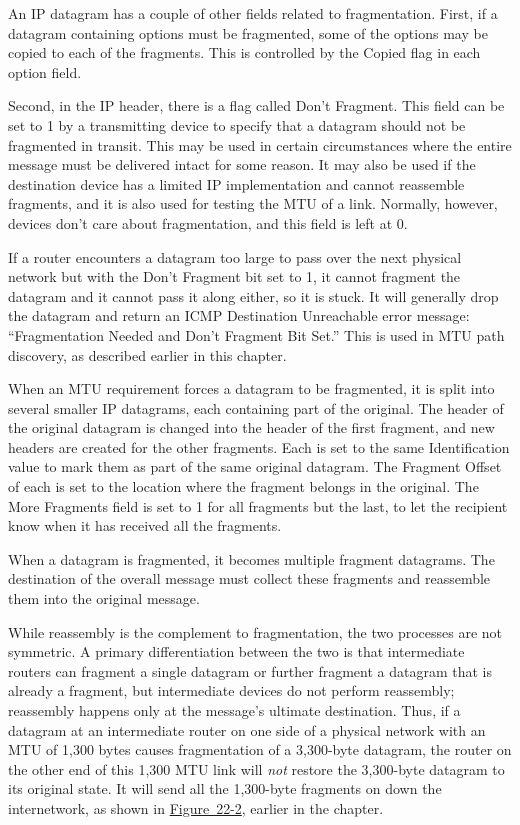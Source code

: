 An IP datagram has a couple of other fields related to fragmentation.
First, if a datagram containing options must be fragmented, some of the
options may be copied to each of the fragments. This is controlled by
the \protect\hypertarget{ch22s02.htmlux5cux23idx-CHP-22-0812}{}{}Copied
flag in each option field.

Second, in the IP header, there is a flag called
\protect\hypertarget{ch22s02.htmlux5cux23idx-CHP-22-0813}{}{}Don't
Fragment. This field can be set to 1 by a transmitting device to specify
that a datagram should not be fragmented in transit. This may be used in
certain circumstances where the entire message must be delivered intact
for some reason. It may also be used if the destination device has a
limited IP implementation and cannot reassemble fragments, and it is
also used for testing the MTU of a link. Normally, however, devices
don't care about fragmentation, and this field is left at 0.

If a router encounters a datagram too large to pass over the next
physical network but with the Don't Fragment bit set to 1, it cannot
fragment the datagram and it cannot pass it along either, so it is
stuck. It will generally drop the datagram and return an ICMP
Destination Unreachable error message: ``Fragmentation Needed and Don't
Fragment Bit Set.'' This is used in MTU path discovery, as described
earlier in this chapter.

\begin{keyconcept}
When an MTU requirement forces a datagram to be
fragmented, it is split into several smaller IP datagrams, each
containing part of the original. The header of the original datagram is
changed into the header of the first fragment, and new headers are
created for the other fragments. Each is set to the same Identification
value to mark them as part of the same original datagram. The Fragment
Offset of each is set to the location where the fragment belongs in the
original. The More Fragments field is set to 1 for all fragments but the
last, to let the recipient know when it has received all the fragments.
\end{keyconcept}

When a datagram is fragmented, it becomes multiple fragment datagrams. The
destination of the overall message must collect these fragments and
reassemble them into the original message.

While reassembly is the complement to fragmentation, the two processes are not symmetric.
A primary differentiation between the two is that intermediate routers
can fragment a single datagram or further fragment a datagram that is
already a fragment, but intermediate devices do not perform reassembly;
reassembly happens only at the message's ultimate destination. Thus, if
a datagram at an intermediate router on one side of a physical network
with an MTU of 1,300 bytes causes fragmentation of a 3,300-byte
datagram, the router on the other end of this 1,300 MTU link will
\emph{not} restore the 3,300-byte datagram to its original state. It
will send all the 1,300-byte fragments on down the internetwork, as
shown in
\protect\hyperlink{ch22.htmlux5cux23ipv4_datagram_fragmentation_this_example}{Figure~22-2},
earlier in the chapter.

